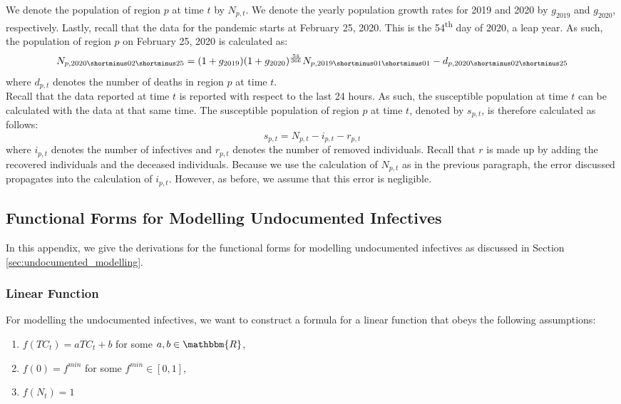\documentclass[12pt]{article}
\newcommand{\R}{\mathbbm{R}}
\begin{document}
\begin{appendices}
		We denote the population of region $p$ at time $t$ by $N_{p,t}$. We denote the yearly population growth rates for 2019 and 2020 by $g_{2019}$ and $g_{2020}$, respectively. Lastly, recall that the data for the pandemic starts at February 25, 2020. This is the 54\textsuperscript{th} day of 2020, a leap year. As such, the population of region $p$ on February 25, 2020 is calculated as:
		\begin{equation}\label{eq:calc_total_population}
		    N_{p, 2020\shortminus02\shortminus25} = (1+g_{2019})(1+g_{2020})^{\frac{54}{366}}N_{p, 2019\shortminus01\shortminus01} - d_{p, 2020\shortminus02\shortminus25}
		\end{equation}
		where $d_{p,t}$ denotes the number of deaths in region $p$ at time $t$. \\
		
		Recall that the data reported at time $t$ is reported with respect to the last 24 hours. As such, the susceptible population at time $t$ can be calculated with the data at that same time. The susceptible population of region $p$ at time $t$, denoted by $s_{p,t}$, is therefore calculated as follows:
		\begin{equation}\label{eq:calc_susceptible_population}
		    s_{p,t} = N_{p,t} - i_{p,t} - r_{p,t}
		\end{equation}
		where $i_{p,t}$ denotes the number of infectives and $r_{p,t}$ denotes the number of removed individuals. Recall that $r$ is made up by adding the recovered individuals and the deceased individuals. Because we use the calculation of $N_{p,t}$ as in the previous paragraph, the error discussed propagates into the calculation of $i_{p,t}$. However, as before, we assume that this error is negligible.
		
		\subsection{Functional Forms for Modelling Undocumented Infectives}\label{sapp:derivation_undocumented_infectives}
		In this appendix, we give the derivations for the functional forms for modelling undocumented infectives as discussed in Section \ref{sec:undocumented_modelling}.
		
		\subsubsection{Linear Function} \label{ssapp:linear_derivation}
		For modelling the undocumented infectives, we want to construct a formula for a linear function that obeys the following assumptions:
		\begin{enumerate}[label=(\Roman*)]
		    \item\label{ass:linear_formula} $f(TC_t) = aTC_t + b$  for some $a, b \in \R$,
		    \item\label{ass:linear_0} $f(0) = f^{min}$ for some $f^{min} \in [0,1]$,
		    \item\label{ass:linear_N} $f(N_t) = 1$
		\end{enumerate}
		

\end{appendices}
\end{document}
